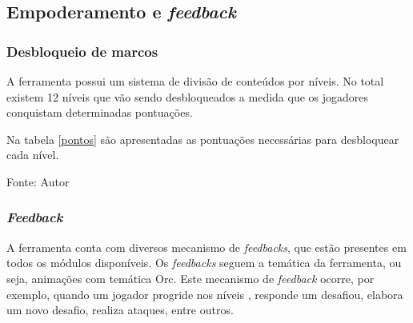  \subsection{Empoderamento e \textit{feedback}}
	 \subsubsection{Desbloqueio de marcos}
	A ferramenta possui um sistema de divisão de conteúdos por níveis. No total existem 12 níveis que vão sendo desbloqueados a medida que os jogadores conquistam determinadas pontuações.

	Na tabela \ref{pontos} são apresentadas as pontuações necessárias para desbloquear cada nível.


\begin{table}[h]
	\centering
	\caption{Pontuações}
	\label{pontos}
	Fonte: Autor
\end{table}

\subsubsection{\textit{Feedback}}

A ferramenta conta com diversos mecanismo de \textit{feedbacks}, que estão presentes em todos os módulos disponíveis.
Os \textit{feedbacks} seguem a temática da ferramenta, ou seja, animações com temática Orc. Este mecanismo de \textit{feedback} ocorre, por exemplo, quando um jogador progride nos níveis
, responde um desafiou, elabora um novo desafio, realiza ataques, entre outros.

